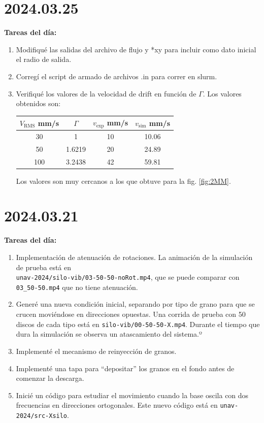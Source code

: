 \documentclass[11pt]{article}
\begin{document}
\section*{2024.03.25}
\textbf{Tareas del día:}
\begin{enumerate}
\item Modifiqué las salidas del archivo de flujo y *xy para incluir como dato inicial el radio de salida.
\item Corregí el script de armado de archivos .in para correr en slurm.
\item Verifiqué los valores de la velocidad de drift en función de $\Gamma$. Los valores obtenidos son:
    \begin{center}
        \begin{tabular}{cccc}
            \toprule
            $V_{\text{RMS}}$ \unit{mm/s} & $\Gamma$ & $v_{\text{exp}}$ \unit{mm/s} & $v_{\text{sim}}$ \unit{mm/s} \\
            \midrule
            30 & 1 & 10 & 10.06 \\
            50 & 1.6219 & 20 & 24.89 \\
            100 & 3.2438 & 42 & 59.81 \\
            \bottomrule
        \end{tabular}
    \end{center}
    Los valores son muy cercanos a los que obtuve para la fig. \ref{fig:2MM}.
\end{enumerate}

\section*{2024.03.21}
\textbf{Tareas del día:}
\begin{enumerate}
    \item Implementación de atenuación de rotaciones. La animación de la simulación de prueba está en\\
        \texttt{unav-2024/silo-vib/03-50-50-noRot.mp4}, que se puede comparar con \texttt{03\_50-50.mp4} que no tiene atenuación.
    \item Generé una nueva condición inicial, separando por tipo de grano para que se crucen moviéndose en direcciones opuestas. Una corrida de prueba con 50 discos de cada tipo está en \texttt{silo-vib/00-50-50-X.mp4}.
        Durante el tiempo que dura la simulación se observa un atascamiento del sistema.º
    \item Implementé el mecanismo de reinyección de granos.
    \item Implementé una tapa para ``depositar'' los granos en el fondo antes de comenzar la descarga.
    \item Inicié un código para estudiar el movimiento cuando la base oscila con dos frecuencias en direcciones ortogonales. Este nuevo código está en \texttt{unav-2024/src-Xsilo}.
\end{enumerate}
\end{document}
